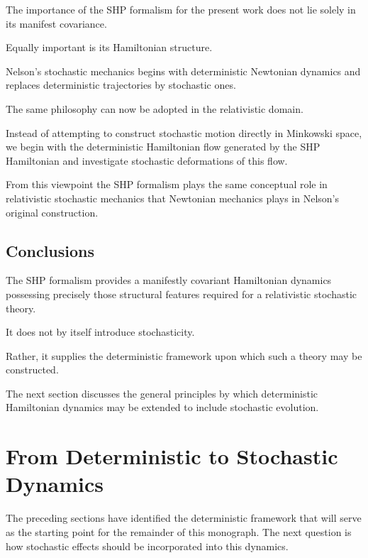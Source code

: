 The importance of the SHP formalism for the present work does not lie
solely in its manifest covariance.

Equally important is its Hamiltonian structure.

Nelson's stochastic mechanics begins with deterministic Newtonian
dynamics and replaces deterministic trajectories by stochastic ones.

The same philosophy can now be adopted in the relativistic domain.

Instead of attempting to construct stochastic motion directly in
Minkowski space, we begin with the deterministic Hamiltonian flow
generated by the SHP Hamiltonian and investigate stochastic
deformations of this flow.

From this viewpoint the SHP formalism plays the same conceptual role in
relativistic stochastic mechanics that Newtonian mechanics plays in
Nelson's original construction.

\subsection{Conclusions}

The SHP formalism provides a manifestly covariant Hamiltonian dynamics
possessing precisely those structural features required for a
relativistic stochastic theory.

It does not by itself introduce stochasticity.

Rather, it supplies the deterministic framework upon which such a theory
may be constructed.

The next section discusses the general principles by which deterministic
Hamiltonian dynamics may be extended to include stochastic evolution.



\section{From Deterministic to Stochastic Dynamics}

The preceding sections have identified the deterministic framework that
will serve as the starting point for the remainder of this monograph.
The next question is how stochastic effects should be incorporated into
this dynamics.

